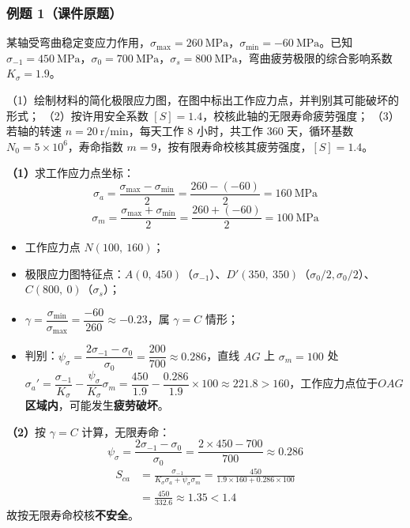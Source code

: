 \subsubsection{例题 1（课件原题）}

\begin{longexample}[单向稳定变应力疲劳强度校核]
\label{ex:单向疲劳校核}
某轴受弯曲稳定变应力作用，$\sigma_{\max}=260\ \mathrm{MPa}$，$\sigma_{\min}=-60\ \mathrm{MPa}$。已知 $\sigma_{-1}=450\ \mathrm{MPa}$，$\sigma_0=700\ \mathrm{MPa}$，$\sigma_s=800\ \mathrm{MPa}$，弯曲疲劳极限的综合影响系数 $K_\sigma=1.9$。

（1）绘制材料的简化极限应力图，在图中标出工作应力点，并判别其可能破坏的形式；
（2）按许用安全系数 $[S]=1.4$，校核此轴的无限寿命疲劳强度；
（3）若轴的转速 $n=20\ \mathrm{r/min}$，每天工作 8 小时，共工作 360 天，循环基数 $N_0=5\times10^6$，寿命指数 $m=9$，按有限寿命校核其疲劳强度，$[S]=1.4$。

\begin{solution}
\textbf{（1）}求工作应力点坐标：
\begin{equation}
	\sigma_a=\frac{\sigma_{\max}-\sigma_{\min}}{2}=\frac{260-(-60)}{2}=160\ \mathrm{MPa}
	\label{eq:强度:例1应力幅}
\end{equation}
\begin{equation}
	\sigma_m=\frac{\sigma_{\max}+\sigma_{\min}}{2}=\frac{260+(-60)}{2}=100\ \mathrm{MPa}
	\label{eq:强度:例1平均应力}
\end{equation}
\begin{itemize}
	\item 工作应力点 $N(100,\ 160)$；
	\item 极限应力图特征点：$A(0,\ 450)$（$\sigma_{-1}$）、$D'(350,\ 350)$（$\sigma_0/2,\sigma_0/2$）、$C(800,\ 0)$（$\sigma_s$）；
	\item $\gamma=\dfrac{\sigma_{\min}}{\sigma_{\max}}=\dfrac{-60}{260}\approx-0.23$，属 $\gamma=C$ 情形；
	\item 判别：$\psi_\sigma=\dfrac{2\sigma_{-1}-\sigma_0}{\sigma_0}=\dfrac{200}{700}\approx0.286$，直线 $AG$ 上 $\sigma_m=100$ 处 $\sigma_a'=\dfrac{\sigma_{-1}}{K_\sigma}-\dfrac{\psi_\sigma}{K_\sigma}\sigma_m=\dfrac{450}{1.9}-\dfrac{0.286}{1.9}\times100\approx221.8>160$，工作应力点位于\textbf{$OAG$ 区域内}，可能发生\textbf{疲劳破坏}。
\end{itemize}

\textbf{（2）}按 $\gamma=C$ 计算，无限寿命：
\begin{equation}
	\psi_\sigma=\frac{2\sigma_{-1}-\sigma_0}{\sigma_0}=\frac{2\times450-700}{700}\approx0.286
	\label{eq:强度:例1psi}
\end{equation}
\begin{equation}
	\begin{aligned}
		S_{ca}&=\frac{\sigma_{-1}}{K_\sigma\sigma_a+\psi_\sigma\sigma_m}=\frac{450}{1.9\times160+0.286\times100}\\
		&=\frac{450}{332.6}\approx1.35<1.4
	\end{aligned}
	\label{eq:强度:例1无限寿命}
\end{equation}
故按无限寿命校核\textbf{不安全}。


\end{solution}
\end{longexample}
